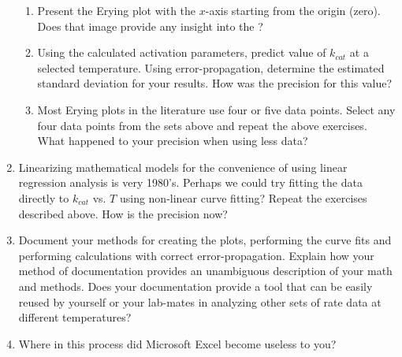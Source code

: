 \documentclass{tufte-handout}
\begin{document}
\begin{enumerate}
\begin{enumerate}
\item Present the Erying plot with the $x$-axis starting from the origin (zero). Does that image provide any insight into the ?

\item Using the calculated activation parameters, predict value of $k_{cat}$ at a selected temperature. Using error-propagation, determine the estimated standard deviation for your results. How was the precision for this value?

\item Most Erying plots in the literature use four or five data points. Select any four data points from the sets above and repeat the above exercises. What happened to your precision when using less data?

\end{enumerate}

\item Linearizing mathematical models for the convenience of using linear re\-gres\-sion analysis is very 1980's. Perhaps we could try fitting the data directly to $k_{cat}$ vs. $T$ using non-linear curve fitting? Repeat the exercises described above. How is the precision now?

\item Document your methods for creating the plots, performing the curve fits and performing calculations with correct error-propagation. Explain how your method of documentation provides an unambiguous description of your math and methods. Does your documentation provide a tool that can be easily reused by yourself or your lab-mates in analyzing other sets of rate data at different temperatures?

\item Where in this process did Microsoft Excel become useless to you?

\end{enumerate}
\end{document}
